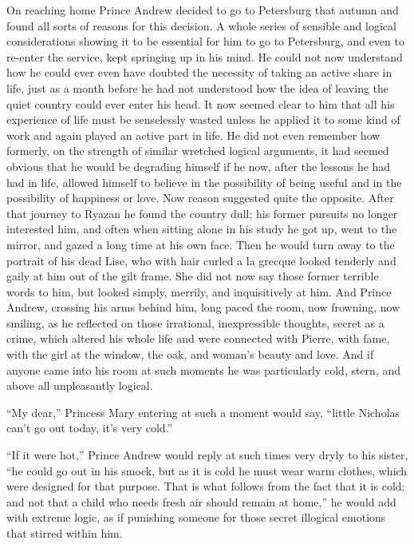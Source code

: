 On reaching home Prince Andrew decided to go to Petersburg that
autumn and found all sorts of reasons for this decision. A whole
series of sensible and logical considerations showing it to be
essential for him to go to Petersburg, and even to re-enter the
service, kept springing up in his mind. He could not now
understand how he could ever even have doubted the necessity of
taking an active share in life, just as a month before he had not
understood how the idea of leaving the quiet country could ever
enter his head. It now seemed clear to him that all his
experience of life must be senselessly wasted unless he applied
it to some kind of work and again played an active part in
life. He did not even remember how formerly, on the strength of
similar wretched logical arguments, it had seemed obvious that he
would be degrading himself if he now, after the lessons he had
had in life, allowed himself to believe in the possibility of
being useful and in the possibility of happiness or love. Now
reason suggested quite the opposite. After that journey to Ryazan
he found the country dull; his former pursuits no longer
interested him, and often when sitting alone in his study he got
up, went to the mirror, and gazed a long time at his own
face. Then he would turn away to the portrait of his dead Lise,
who with hair curled a la grecque looked tenderly and gaily at
him out of the gilt frame. She did not now say those former
terrible words to him, but looked simply, merrily, and
inquisitively at him. And Prince Andrew, crossing his arms behind
him, long paced the room, now frowning, now smiling, as he
reflected on those irrational, inexpressible thoughts, secret as
a crime, which altered his whole life and were connected with
Pierre, with fame, with the girl at the window, the oak, and
woman's beauty and love.  And if anyone came into his room at
such moments he was particularly cold, stern, and above all
unpleasantly logical.

``My dear,'' Princess Mary entering at such a moment would say,
``little Nicholas can't go out today, it's very cold.''

``If it were hot,'' Prince Andrew would reply at such times very
dryly to his sister, ``he could go out in his smock, but as it is
cold he must wear warm clothes, which were designed for that
purpose. That is what follows from the fact that it is cold; and
not that a child who needs fresh air should remain at home,'' he
would add with extreme logic, as if punishing someone for those
secret illogical emotions that stirred within him.

